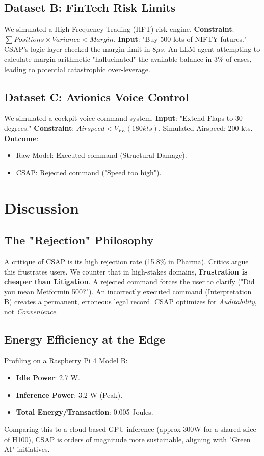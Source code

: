 \documentclass[11pt]{article}
\begin{document}
\subsection{Dataset B: FinTech Risk Limits}
We simulated a High-Frequency Trading (HFT) risk engine.
\textbf{Constraint}: $\sum Positions \times Variance < Margin$.
\textbf{Input}: "Buy 500 lots of NIFTY futures."
CSAP's logic layer checked the margin limit in $8\mu s$. An LLM agent attempting to calculate margin arithmetic "hallucinated" the available balance in 3\% of cases, leading to potential catastrophic over-leverage.

\subsection{Dataset C: Avionics Voice Control}
We simulated a cockpit voice command system.
\textbf{Input}: "Extend Flaps to 30 degrees."
\textbf{Constraint}: $Airspeed < V_{FE} (180 kts)$.
Simulated Airspeed: 200 kts.
\textbf{Outcome}:
\begin{itemize}
    \item Raw Model: Executed command (Structural Damage).
    \item CSAP: Rejected command ("Speed too high").
\end{itemize}

\section{Discussion}

\subsection{The "Rejection" Philosophy}
A critique of CSAP is its high rejection rate (15.8\% in Pharma). Critics argue this frustrates users. We counter that in high-stakes domains, \textbf{Frustration is cheaper than Litigation}. A rejected command forces the user to clarify ("Did you mean Metformin 500?"). An incorrectly executed command (Interpretation B) creates a permanent, erroneous legal record. CSAP optimizes for \textit{Auditability}, not \textit{Convenience}.

\subsection{Energy Efficiency at the Edge}
Profiling on a Raspberry Pi 4 Model B:
\begin{itemize}
    \item \textbf{Idle Power}: 2.7 W.
    \item \textbf{Inference Power}: 3.2 W (Peak).
    \item \textbf{Total Energy/Transaction}: 0.005 Joules.
\end{itemize}
Comparing this to a cloud-based GPU inference (approx 300W for a shared slice of H100), CSAP is orders of magnitude more sustainable, aligning with "Green AI" initiatives.
\end{document}
